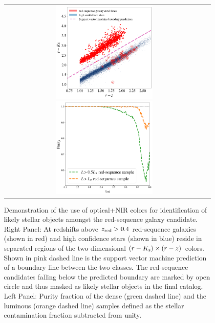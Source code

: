 \documentclass[fleqn,usenatbib,useAMS]{mnras}
\begin{document}
\begin{figure}
\begin{tabular}{cc}
\includegraphics[width=0.5\textwidth]{figures_tmp/stars_SVM_lum.png}
\includegraphics[width=0.5\textwidth]{figures_tmp/lrg_purity.png}
\end{tabular}
\caption{\label{fig:star_galaxy_II} Demonstration of the use of optical+NIR colors for identification of likely stellar objects amongst the red-sequence galaxy candidate. Right Panel: At redshifts above $z_{\rm red}>0.4$ red-sequence galaxies (shown in red) and high confidence stars (shown in blue) reside in separated regions of the two-dimensional $(r-K_{\rm s}) \times (r-z)$ colors. Shown in pink dashed line is the support vector machine prediction of a boundary line between the two classes. The red-sequence candidates falling below the predicted boundary are marked by open circle and thus masked as likely stellar objects in the final catalog. Left Panel: Purity fraction of the dense  (green dashed line) and the luminous (orange dashed line) samples defined as the stellar contamination fraction subtracted from unity.} 
\end{figure}
\end{document}
